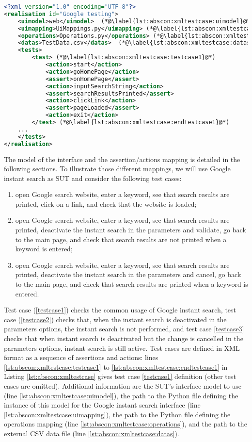 \begin{lstlisting}[language=XML,
float,
label=lst:abscon:xmltestcase,
caption={Google instant search test cases in AbsCon XML format}]
<?xml version="1.0" encoding="UTF-8"?>
<realisation id="Google testing">
	<uimodel>web</uimodel>  (*@\label{lst:abscon:xmltestcase:uimodel}@*)	
	<uimapping>UiMappings.py</uimapping> (*@\label{lst:abscon:xmltestcase:uimapping}@*)
	<operations>Operations.py</operations> (*@\label{lst:abscon:xmltestcase:operations}@*)
	<datas>TestData.csv</datas>  (*@\label{lst:abscon:xmltestcase:datas}@*)
	<tests>
		<test> (*@\label{lst:abscon:xmltestcase:testcase1}@*)
			<action>start</action>
			<action>goHomePage</action>
			<assert>onHomePage</assert>
			<action>inputSearchString</action>
			<assert>searchResultsPrinted</assert>
			<action>clickLink</action>
			<assert>pageLoaded</assert>
			<action>exit</action>
		</test> (*@\label{lst:abscon:xmltestcase:endtestcase1}@*)
	...
	</tests>
</realisation>
\end{lstlisting}

The model of the interface and the assertion/actions mapping is detailed in the following sections. To illustrate those different mappings, we will use Google instant search as SUT and consider the following test cases:
%
\begin{enumerate}
\item \label{testcase1} open Google search website, enter a keyword, see that search results are printed, click on a link, and check that the website is loaded;
\item \label{testcase2} open Google search website, enter a keyword, see that search results are printed, deactivate the instant search in the parameters and validate, go back to the main page, and check that search results are not printed when a keyword is entered;
\item \label{testcase3} open Google search website, enter a keyword, see that search results are printed, deactivate the instant search in the parameters and cancel, go back to the main page, and check that search results are printed when a keyword is entered.
\end{enumerate}
%
Test case (\ref{testcase1}) checks the common usage of Google instant search, test case (\ref{testcase2}) checks that, when the instant search is deactivated in the parameters options, the instant search is not performed, and test case \ref{testcase3} checks that when instant search is deactivated but the change is cancelled in the parameters options, instant search is still active. 
Test cases are defined in XML format as a sequence of assertions and actions: lines \ref{lst:abscon:xmltestcase:testcase1} to \ref{lst:abscon:xmltestcase:endtestcase1} in Listing \ref{lst:abscon:xmltestcase} gives test case \ref{testcase1} definition (other test cases are omitted). Additional information are the SUT's interface model to use (line \ref{lst:abscon:xmltestcase:uimodel}), the path to the Python file defining the instance of this model for the Google instant search interface (line \ref{lst:abscon:xmltestcase:uimapping}), the path to the Python file defining the operations mapping (line \ref{lst:abscon:xmltestcase:operations}), and the path to the external CSV data file (line \ref{lst:abscon:xmltestcase:datas}).

